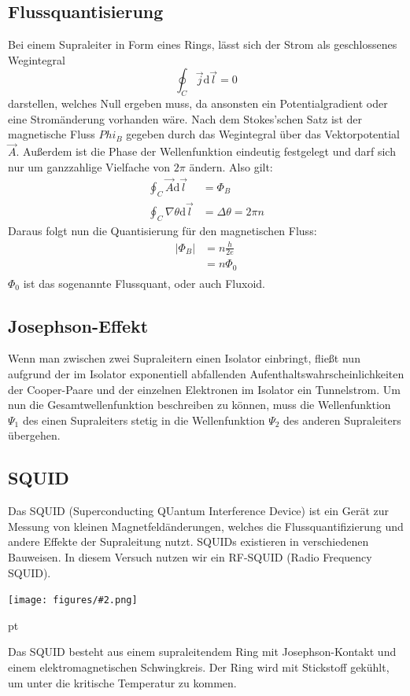 \documentclass[12pt]{article}
\newcommand{\gra}[3][0.7]{
	\begin{minipage}[h!]{\textwidth}
		\centering
		\texttt{[image: figures/\#2.png]}
		\captionof{figure}{#3}
	\end{minipage}
	\vskip 30 pt
}
\begin{document}
\subsection{Flussquantisierung}
Bei einem Supraleiter in Form eines Rings, lässt sich der Strom als geschlossenes Wegintegral $$\oint_C\vec j\mathrm d\vec l=0$$ darstellen, welches Null ergeben muss, da ansonsten ein Potentialgradient oder eine Stromänderung vorhanden wäre. Nach dem Stokes'schen Satz ist der magnetische Fluss $Phi_B$ gegeben durch das Wegintegral über das Vektorpotential $\vec{A}$. Außerdem ist die Phase der Wellenfunktion eindeutig festgelegt und darf sich nur um ganzzahlige Vielfache von $2\pi$ ändern. Also gilt:
\begin{align*}
	\oint_C\vec A\mathrm d\vec l&=\Phi_B\\
	\oint_C\nabla\theta\mathrm d\vec l&=\Delta\theta=2\pi n
\end{align*}
Daraus folgt nun die Quantisierung für den magnetischen Fluss:
\begin{align*}
	|\Phi_B|&=n\frac h{2e}\\
	&=n\Phi_0
\end{align*}
$\Phi_0$ ist das sogenannte Flussquant, oder auch Fluxoid. \textsuperscript{\cite{anleitung}}
\subsection{Josephson-Effekt}
Wenn man zwischen zwei Supraleitern einen Isolator einbringt, fließt nun aufgrund der im Isolator exponentiell abfallenden Aufenthaltswahrscheinlichkeiten der Cooper-Paare und der einzelnen Elektronen im Isolator ein Tunnelstrom. Um nun die Gesamtwellenfunktion beschreiben zu können, muss die Wellenfunktion $\Psi_1$ des einen Supraleiters stetig in die Wellenfunktion $\Psi_2$ des anderen Supraleiters übergehen. 

\subsection{SQUID}
Das SQUID (Superconducting QUantum Interference Device) ist ein Gerät zur Messung von kleinen Magnetfeldänderungen, welches die Flussquantifizierung und andere Effekte der Supraleitung nutzt. SQUIDs existieren in verschiedenen Bauweisen. In diesem Versuch nutzen wir ein RF-SQUID (Radio Frequency SQUID).

\gra{squid}{Aufbau eines RF-SQUIDs}

Das SQUID besteht aus einem supraleitendem Ring mit Josephson-Kontakt und einem elektromagnetischen Schwingkreis. Der Ring wird mit Stickstoff gekühlt, um unter die kritische Temperatur zu kommen.
\end{document}

